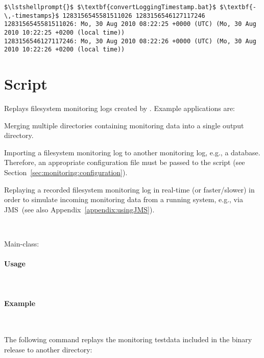 \begin{lstlisting}[caption=Execution under Windows]
$\lstshellprompt{}$ $\textbf{convertLoggingTimestamp.bat}$ $\textbf{-\,-timestamps}$ 1283156545581511026 1283156546127117246 
1283156545581511026: Mo, 30 Aug 2010 08:22:25 +0000 (UTC) (Mo, 30 Aug 2010 10:22:25 +0200 (local time))
1283156546127117246: Mo, 30 Aug 2010 08:22:26 +0000 (UTC) (Mo, 30 Aug 2010 10:22:26 +0200 (local time))
\end{lstlisting}


\section{Script }

Replays filesystem monitoring logs created by \KickerMonitoringPart{}. %
Example applications are:
\begin{compactitem}
\item Merging multiple directories containing monitoring data into a single %
output directory. 
\item Importing a filesystem monitoring log to another monitoring log, e.g., %
a database. Therefore, an appropriate \KickerMonitoringPart{} configuration %
file must be passed to the script (see Section~\ref{sec:monitoring:configuration}).
\item Replaying a recorded filesystem monitoring log in real-time (or faster/slower) in order to simulate %
incoming monitoring data from a running system, e.g., via JMS~(see also Appendix~\ref{appendix:usingJMS}). 
\end{compactitem}

\

\noindent Main-class: {\small {}}

\paragraph*{Usage}\

\setTextListing


\paragraph*{Example}\

\noindent The following command replays the monitoring testdata included in %
the binary release to another directory:

